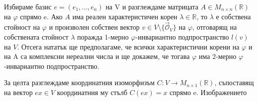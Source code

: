 \documentclass{article}
\newcommand*{\nullvec}{\vec{\mathcal{O}}}
\begin{document}
Избираме базис $e = (e_1, . . . , e_n)$ на V и разглеждаме
матрицата $A \in M_{n\times n}(\mathbb{R})$ на $\varphi$ спрямо e.
Ако $A$ има реален характеристичен корен $\lambda \in \mathbb{R}$, то $\lambda$ е собствена стойност на
$\varphi$ и произволен собствен вектор $v \in V \setminus \{\nullvec_V\}$ на $\varphi$, отговарящ на
собствената стойност $\lambda$ поражда 1-мерно $\varphi$-инвариантно подпространство $l(v)$ на $V$.
Отсега нататък ще предполагаме, че всички характеристични корени на $\varphi$ и
на A са комплексни нереални числа и ще докажем, че тогава $\varphi$ има 2-мерно
$\varphi$-инвариантно подпространство.

За целта разглеждаме координатния изоморфизъм $C : V \rightarrow M_{n\times 1}(\mathbb{R})$, съпоставящ на
вектор $ex \in V$ координатния му стълб $C(ex) = x$ спрямо e. Изображението
\end{document}
